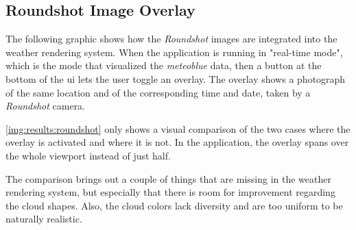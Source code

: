 \subsection{Roundshot Image Overlay}
The following graphic shows how the \emph{Roundshot} images are integrated into the weather rendering system.
When the application is running in "real-time mode", which is the mode that visualized the \emph{meteoblue} data, then a button at the bottom of the \gls{ui} lets the user toggle an overlay.
The overlay shows a photograph of the same location and of the corresponding time and date, taken by a \emph{Roundshot} camera.

\begin{figure}[H]
    \centering
    \label{img:results:roundshot}
\end{figure}

\clearpage

\noindent
\autoref{img:results:roundshot} only shows a visual comparison of the two cases where the overlay is activated and where it is not.
In the application, the overlay spans over the whole viewport instead of just half.

\noindent
The comparison brings out a couple of things that are missing in the weather rendering system, but especially that there is room for improvement regarding the cloud shapes.
Also, the cloud colors lack diversity and are too uniform to be naturally realistic.

